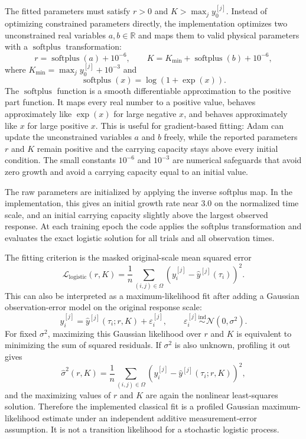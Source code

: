 \documentclass[11pt]{article}
\begin{document}
            The fitted parameters must satisfy $r>0$ and $K>\max_j y_0^{[j]}$.
        Instead of optimizing constrained parameters directly, the
        implementation optimizes two unconstrained real variables
        $a, b \in\mathbb R$ and maps them to valid physical parameters with a
        $\operatorname{softplus}$ transformation:
        $$
            r = \operatorname{softplus}(a)+10^{-6},
                \qquad
                K = K_{\min} +
                \operatorname{softplus}(b)+10^{-6},
        $$
        where $K_{\min}=\max_j y_0^{[j]}+10^{-3}$ and
        $$
            \operatorname{softplus}(x)=\log(1+\exp(x)).
        $$
        The $\operatorname{softplus}$ function is a smooth differentiable
        approximation to the positive part function. It maps every real number
        to a positive value, behaves approximately like $\exp(x)$ for large
        negative $x$, and behaves approximately like $x$ for large positive
        $x$. This is useful for gradient-based fitting:
        Adam can update the unconstrained variables $a$ and $b$ freely, while
        the reported parameters $r$ and $K$ remain positive and the carrying
        capacity stays above every initial condition. The small constants
        $10^{-6}$ and $10^{-3}$ are numerical safeguards that avoid zero growth
        and avoid a carrying capacity equal to an initial value.

The raw parameters are initialized by applying the inverse softplus map. In the
implementation, this gives an initial growth rate near $3.0$ on the normalized
time scale, and an initial carrying capacity slightly above the largest
observed response. At each training epoch the code applies the softplus
transformation and evaluates the exact logistic solution for all trials and all
observation times.

The fitting criterion is the masked original-scale mean squared error
$$
  \mathcal L_{\mathrm{logistic}}(r,K)
  =
  \frac{1}{n}
  \sum_{(i,j)\in\Omega}
  \left(y_i^{[j]}-\widehat y^{[j]}(\tau_i)\right)^2.
$$
This can also be interpreted as a maximum-likelihood fit after adding a
Gaussian observation-error model on the original response scale:
$$
  y_i^{[j]}
  =
  \widehat y^{[j]}(\tau_i;r,K)+\varepsilon_i^{[j]},
  \qquad
  \varepsilon_i^{[j]}\stackrel{\mathrm{ind}}{\sim}
  \mathcal N(0,\sigma^2).
$$
For fixed $\sigma^2$, maximizing this Gaussian likelihood over $r$ and $K$ is
equivalent to minimizing the sum of squared residuals. If $\sigma^2$ is also
unknown, profiling it out gives
$$
  \widehat\sigma^2(r,K)
  =
  \frac{1}{n}
  \sum_{(i,j)\in\Omega}
  \left(y_i^{[j]}-\widehat y^{[j]}(\tau_i;r,K)\right)^2,
$$
and the maximizing values of $r$ and $K$ are again the nonlinear least-squares
solution. Therefore the implemented classical fit is a profiled Gaussian
maximum-likelihood estimate under an independent additive measurement-error
assumption. It is not a transition likelihood for a stochastic logistic process.
\end{document}
